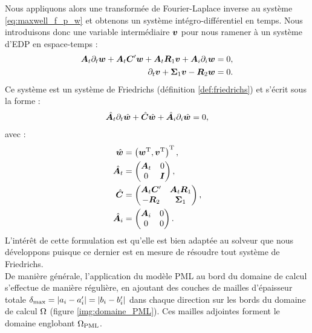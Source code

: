 Nous appliquons alors une transformée de Fourier-Laplace inverse au système
\eqref{eq:maxwell_f_p_w} et obtenons un système intégro-différentiel en temps.
Nous introduisons donc une variable intermédiaire $\bm{v}$ pour nous ramener
à un système d’EDP en espace-temps :
\begin{subequations}
	\begin{align}
		\bm{A}_{t} \partial_{t} \bm{w} + \bm{A}_{t} \bm{C}' \bm{w} + \bm{A}_{t} \bm{R}_1 \bm{v}
		+ {\bm{A}_{i}\partial_{i}} \bm{w} &= 0 ,
		\\
		\partial_{t} \bm{v} + \bm{\Sigma}_1 \bm{v}
		- \bm{R}_2 \bm{w} &= 0 .
	\end{align}
\end{subequations}
Ce système est un système de Friedrichs (définition \ref{def:friedrichs})
et s'écrit sous la forme :
\begin{align}
	\hat{\bm{A}_{t}} \partial_{t} \hat{\bm{w}} + \hat{\bm{C}} \hat{\bm{w}}
	+ \hat{\bm{A}_{i}} \partial_{i} \hat{\bm{w}} = 0 , 
\end{align}
avec :
\begin{subequations}
	\begin{align}
		\hat{\bm{w}} &= \left(
			\bm{w}^{\mathrm{T}} , \bm{v}^{\mathrm{T}} \right)^{\mathrm{T}} ,
		\\
		\hat{\bm{A}_{t}} &= \begin{pmatrix}
			\bm{A}_{t} & 0 \\
			0 & \bm{I}
		\end{pmatrix} ,
		\\
		\hat{\bm{C}} &= \begin{pmatrix}
			\bm{A}_{t} \bm{C}' & \bm{A}_{t} \bm{R}_1 \\
			- \bm{R}_2 & \bm{\Sigma}_1
		\end{pmatrix} ,
		\\
		\hat{\bm{A}_{i}} &= \begin{pmatrix}
			\bm{A}_{i} & 0 \\
			0 & 0
		\end{pmatrix} .
	\end{align}
\end{subequations}
L'intérêt de cette formulation est qu'elle est bien adaptée au solveur
que nous développons puisque ce dernier est en mesure de résoudre
tout système de Friedrichs.
\\

De manière générale, l'application du modèle PML au bord du domaine de calcul
s'effectue de manière régulière, en ajoutant des couches de mailles
d'épaisseur totale $\delta_{\max} = \left\vert a_i - a'_i\right\vert = \left\vert b_i - b'_i\right\vert$ dans chaque direction sur les
bords du domaine de calcul $\Omega$ (figure \ref{img:domaine_PML}).
Ces mailles adjointes forment le domaine englobant
$\Omega_{\mathrm{PML}}$.

